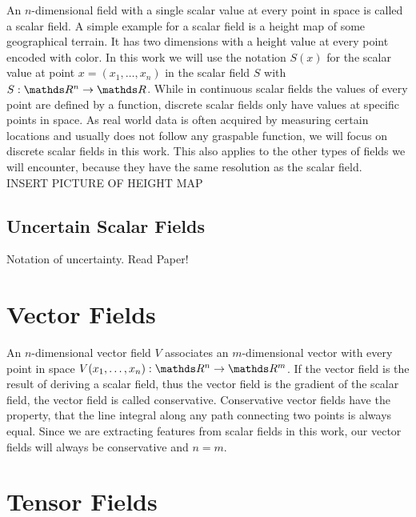 An $n$-dimensional field with a single scalar value at every point in
space is called a scalar field. A simple example for a scalar field is a
height map of some geographical terrain. It has two dimensions with a
height value at every point encoded with color. In this work we will use
the notation $S(x)$ for the scalar value at point $x = (x_1,\dots,x_n)$
in the scalar field $S$ with $S: \real^n \rightarrow \real$. While in
continuous scalar fields the values of every point are defined by a
function, discrete scalar fields only have values at specific points in
space. As real world data is often acquired by measuring certain
locations and usually does not follow any graspable function, we will
focus on discrete scalar fields in this work. This also applies to the
other types of fields we will encounter, because they have the same 
resolution as the scalar field.\\
INSERT PICTURE OF HEIGHT MAP

\subsection{Uncertain Scalar Fields}

Notation of uncertainty. Read Paper!

\section{Vector Fields}

An $n$-dimensional vector field $V$ associates an $m$-dimensional vector
with every point in space $V(x_1,\dots,x_n):\real^n \rightarrow \real^m$.
If the vector field is the result of deriving a scalar field, thus the 
vector field is the gradient of the scalar field, the vector field is
called conservative. Conservative vector fields have the property, that
the line integral along any path connecting two points is always equal.
Since we are extracting features from scalar fields in this work, our
vector fields will always be conservative and $n = m$.

\section{Tensor Fields}

